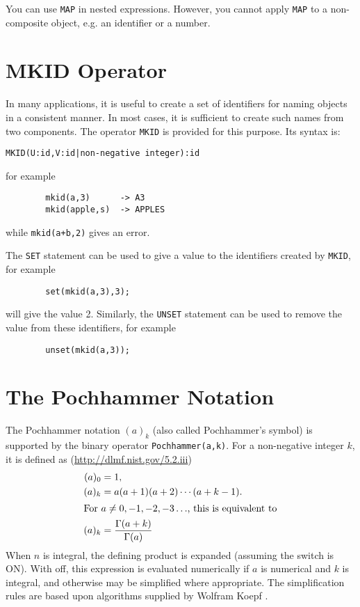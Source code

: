 You can use \texttt{MAP} in nested expressions. However, you cannot
apply \texttt{MAP} to a non-composite object, e.g. an identifier or a number.


\section{MKID Operator}
\hypertarget{operator:MKID}{}
In many applications, it is useful to create a set of identifiers for
naming objects in a consistent manner. In most cases, it is sufficient to
create such names from two components. The operator \texttt{MKID} is provided
for this purpose. Its syntax is:
\begin{verbatim}
MKID(U:id,V:id|non-negative integer):id
\end{verbatim}
for example
\begin{verbatim}
        mkid(a,3)      -> A3
        mkid(apple,s)  -> APPLES
\end{verbatim}
while \texttt{mkid(a+b,2)} gives an error.

The \texttt{SET} statement can be used to give a value to the
identifiers created by \texttt{MKID}, for example
\begin{verbatim}
        set(mkid(a,3),3);
\end{verbatim}
will give  the value 2.
Similarly, the \texttt{UNSET} statement can be used to
remove the value from these identifiers, for example
\begin{verbatim}
        unset(mkid(a,3));
\end{verbatim}

\section{The Pochhammer Notation}
\hypertarget{POCH}{}
\hypertarget{operator:POCHHAMMER}{}
The Pochhammer notation $(a)_k$ (also called Pochhammer's symbol) is supported
by the binary operator \texttt{Pochhammer(a,k)}.
For a non-negative integer $k$, it is defined as
(\url{http://dlmf.nist.gov/5.2.iii})
\begin{align*}
  (a)_0 &= 1, \\
  (a)_k &= a(a+1)(a+2)\cdots(a+k-1).\\
\intertext{For $a\neq 0,-1,-2,-3\ldots$, this is equivalent to}
  (a)_k &= \frac{\Gamma(a+k)}{\Gamma(a)}
\end{align*}
When $n$ is integral, the defining product is expanded (assuming the switch
 is ON). With  off, this expression is evaluated
numerically if $a$ is numerical and $k$ is integral, and otherwise may be
simplified where appropriate.  The simplification rules are based upon
algorithms supplied by Wolfram Koepf \cite{Koepf:92}.


